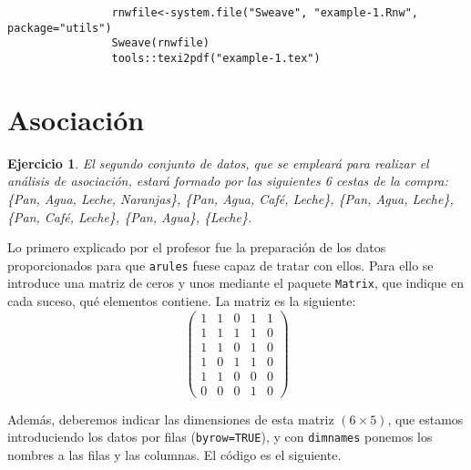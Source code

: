 \documentclass[12pt]{report}\usepackage[]{graphicx}\usepackage[dvipsnames]{xcolor}
\newtheorem{exercise}{Ejercicio}[section]
\begin{document}
			\begin{verbatim}
				rnwfile<-system.file("Sweave", "example-1.Rnw", package="utils")
				Sweave(rnwfile)
				tools::texi2pdf("example-1.tex")
			\end{verbatim}
		
		\section{Asociación}
		
			\begin{exercise}
				El segundo conjunto de datos, que se empleará para realizar el análisis de asociación, estará formado por las siguientes 6 cestas de la compra: \{Pan, Agua, Leche, Naranjas\}, \{Pan, Agua, Café, Leche\}, \{Pan, Agua, Leche\}, \{Pan, Café, Leche\}, \{Pan, Agua\}, \{Leche\}.
			\end{exercise}
				
			Lo primero explicado por el profesor fue la preparación de los datos proporcionados para que \texttt{arules} fuese capaz de tratar con ellos. Para ello se introduce una matriz de ceros y unos mediante el paquete \texttt{Matrix}, que indique en cada suceso, qué elementos contiene. La matriz es la siguiente:
			$$
			\begin{pmatrix}
				1 & 1 & 0 & 1 & 1\\
				1 & 1 & 1 & 1 & 0\\
				1 & 1 & 0 & 1 & 0\\
				1 & 0 & 1 & 1 & 0\\
				1 & 1 & 0 & 0 & 0\\
				0 & 0 & 0 & 1 & 0
			\end{pmatrix}
			$$
			
			Además, deberemos indicar las dimensiones de esta matriz $(6\times5)$, que estamos introduciendo los datos por filas (\texttt{byrow=TRUE}), y con \texttt{dimnames} ponemos los nombres a las filas y las columnas. El código es el siguiente. 
			
\end{document}
